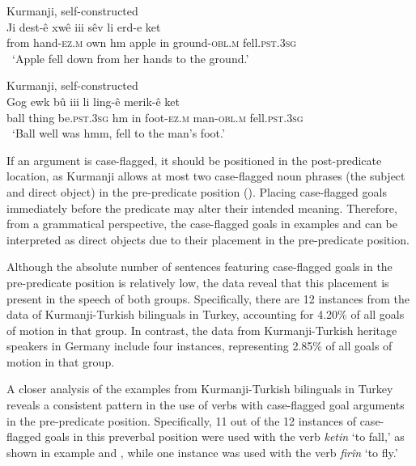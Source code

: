 \ea
    \label{ex:key:58} Kurmanji, self-constructed \\
\gll * Ji   dest-ê     xwê   iii   sêv   li  erd-e     ket\\
{} from  hand-\textsc{ez.m}   own  hm   apple   in  ground\textsc{-obl.m} fell.\textsc{pst.3sg}\\
\glt \, ‘Apple fell down from her hands to the ground.’ 
    \z

\ea
    \label{ex:key:59} Kurmanji, self-constructed \\
\gll * Gog   ewk   bû     iii li  ling-ê     merik-ê      ket\\
{} ball  thing   be.\textsc{pst.3sg}  hm  {} in  foot-\textsc{ez.m}  man-\textsc{obl.m}  fell.\textsc{pst.3sg} \\
\glt \, ‘Ball well was hmm, fell to the man’s foot.’
    \z

If an argument is case-flagged, it should be positioned in the post-predicate location, as Kurmanji allows at most two case-flagged noun phrases (the subject and direct object) in the pre-predicate position (\citealt{Gundogdu2019}). Placing case-flagged goals immediately before the predicate may alter their intended meaning. Therefore, from a grammatical perspective, the case-flagged goals in examples   and  can be interpreted as direct objects due to their placement in the pre-predicate position.

Although the absolute number of sentences featuring case-flagged goals in the pre-predicate position is relatively low, the data reveal that this placement is present in the speech of both groups. Specifically, there are 12 instances from the data of Kurmanji-Turkish bilinguals in Turkey, accounting for 4.20\% of all goals of motion in that group. In contrast, the data from Kurmanji-Turkish heritage speakers in Germany include four instances, representing 2.85\% of all goals of motion in that group.

A closer analysis of the examples from Kurmanji-Turkish bilinguals in Turkey reveals a consistent pattern in the use of verbs with case-flagged goal arguments in the pre-predicate position. Specifically, 11 out of the 12 instances of case-flagged goals in this preverbal position were used with the verb \textit{ketin} ‘to fall,’ as shown in example  and , while one instance was used with the verb \textit{firîn} ‘to fly.’

